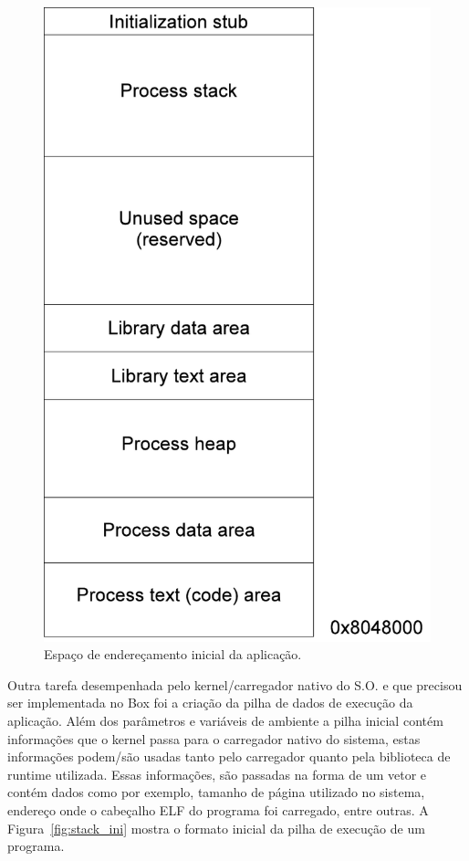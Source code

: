 \documentclass[11pt,twoside]{article}
\begin{document}
\begin{figure}[!h]
        \begin{center}
        \includegraphics[scale=0.5]{figures/esp_end}
        \end{center}
        \caption{Espaço de endereçamento inicial da aplicação.}
        \label{fig:esp_end}
\end{figure}

Outra tarefa desempenhada pelo kernel/carregador nativo do S.O. e que precisou ser
implementada no Box foi a criação da pilha de dados de execução da
aplicação. Além dos parâmetros e variáveis de ambiente a pilha inicial contém
informações que o kernel passa para o carregador nativo do sistema, estas
informações podem/são usadas tanto pelo carregador quanto pela biblioteca de
runtime utilizada. Essas informações, são passadas na forma de um vetor e contém
dados como por exemplo, tamanho de página utilizado no sistema, endereço onde o
cabeçalho ELF do programa foi carregado, entre outras. A
Figura~\ref{fig:stack_ini} mostra o formato inicial da pilha de execução de um
programa.
\end{document}
